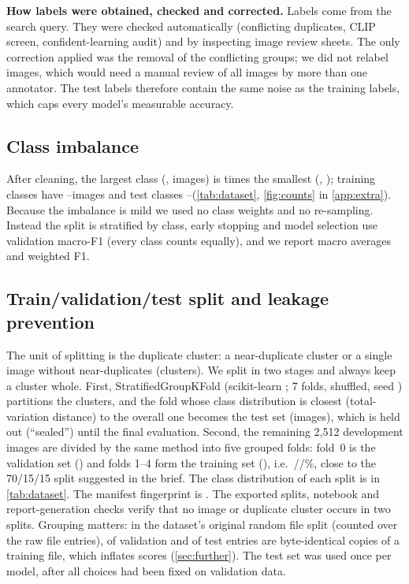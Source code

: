 \documentclass[11pt,a4paper]{article}
\newcommand{\cls}[1]{#1}
\begin{document}
\textbf{How labels were obtained, checked and corrected.} Labels come from the search query. They were checked
automatically (conflicting duplicates, CLIP screen, confident-learning audit) and by inspecting image review sheets. The only correction applied was the removal of the \nConflictGroups conflicting groups; we
did not relabel images, which would need a manual review of all \nRows images by more than one annotator. The test
labels therefore contain the same noise as the training labels, which caps every model's measurable accuracy.

\begin{table}[!tbp]
\centering\footnotesize
\caption{Cleaning pipeline; indented rows break down the row above.}
\label{tab:cleaning}

\end{table}

\subsection{Class imbalance}\label{sec:imbalance}
After cleaning, the largest class (\cls{\classMaxName}, \classMax images) is \imbalance times the smallest
(\cls{\classMinName}, \classMin); training classes have \trainMin--\trainMax images and test classes
\testMin--\testMax (\cref{tab:dataset}, \cref{fig:counts} in \cref{app:extra}). Because the imbalance is mild we used
no class weights and no re-sampling. Instead the split is stratified by class, early stopping and model
selection use validation macro-F1 (every class counts equally), and we report macro averages and weighted F1.

\subsection{Train/validation/test split and leakage prevention}\label{sec:split}
The unit of splitting is the duplicate cluster: a near-duplicate cluster or a single image without
near-duplicates (\nClusters clusters). We split in two stages and always keep a cluster whole. First,
StratifiedGroupKFold (scikit-learn \citep{pedregosa2011sklearn}; 7 folds, shuffled, seed
\splitSeed) partitions the clusters, and the fold whose class distribution is closest (total-variation distance) to
the overall one becomes the test set (\nTest images), which is held out (``sealed'') until the final
evaluation. Second, the remaining 2,512 development images are divided by the same method into five grouped folds:
fold~0 is the validation set (\nVal) and folds 1--4 form the training set (\nTrain), i.e.\
\pctTrain/\pctVal/\pctTest\%, close to the 70/15/15 split suggested in the brief.
The class distribution of each split is in \cref{tab:dataset}. The manifest fingerprint is \fingerprint.
The exported splits, notebook and report-generation checks verify that no image or duplicate cluster occurs in two splits.
Grouping matters: in the dataset's original random file split (counted over the raw file
entries), \legValCopies of \legValEntries
validation and \legTestCopies of \legTestEntries test entries are byte-identical copies of a training file, which
inflates scores \citep{barz2020cifair, kapoor2023leakage} (\cref{sec:further}). The test set was used once per model, after all choices had been fixed on validation data.
\end{document}
